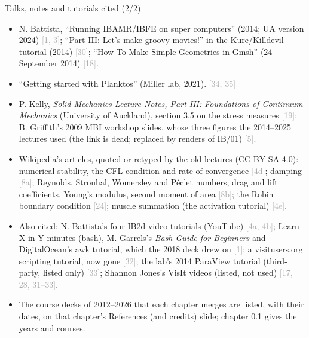 \documentclass[aspectratio=169,11pt]{beamer}
\newcommand{\ch}[1]{\textcolor{DarkGray}{[#1]}}
\begin{document}
\begin{frame}{Talks, notes and tutorials cited (2/2)}
\label{fr:talks2}
\scriptsize
\begin{itemize}\setlength{\itemsep}{2pt}
  \item N. Battista, ``Running IBAMR/IBFE on super computers'' (2014; UA version 2024) \ch{1, 3}; ``Part III: Let's make groovy movies!'' in the Kure/Killdevil tutorial (2014) \ch{30}; ``How To Make Simple Geometries in Gmsh'' (24 September 2014) \ch{18}.
  \item ``Getting started with Planktos'' (Miller lab, 2021). \ch{34, 35}
  \item P. Kelly, \emph{Solid Mechanics Lecture Notes, Part III: Foundations of Continuum Mechanics} (University of Auckland), section 3.5 on the stress measures \ch{19}; B. Griffith's 2009 MBI workshop slides, whose three figures the 2014--2025 lectures used (the link is dead; replaced by renders of IB/01) \ch{5}.
  \item Wikipedia's articles, quoted or retyped by the old lectures (CC BY-SA 4.0): numerical stability, the CFL condition and rate of convergence \ch{4d}; damping \ch{8a}; Reynolds, Strouhal, Womersley and P\'eclet numbers, drag and lift coefficients, Young's modulus, second moment of area \ch{8b}; the Robin boundary condition \ch{24}; muscle summation (the activation tutorial) \ch{4e}.
  \item Also cited: N. Battista's four IB2d video tutorials (YouTube) \ch{4a, 4b}; Learn X in Y minutes (bash), M. Garrels's \emph{Bash Guide for Beginners} and DigitalOcean's awk tutorial, which the 2018 deck drew on \ch{1}; a visitusers.org scripting tutorial, now gone \ch{32}; the lab's 2014 ParaView tutorial (third-party, listed only) \ch{33}; Shannon Jones's VisIt videos (listed, not used) \ch{17, 28, 31--33}.
  \item The course decks of 2012--2026 that each chapter merges are listed, with their dates, on that chapter's References (and credits) slide; chapter 0.1 gives the years and courses.
\end{itemize}
\end{frame}
\end{document}
